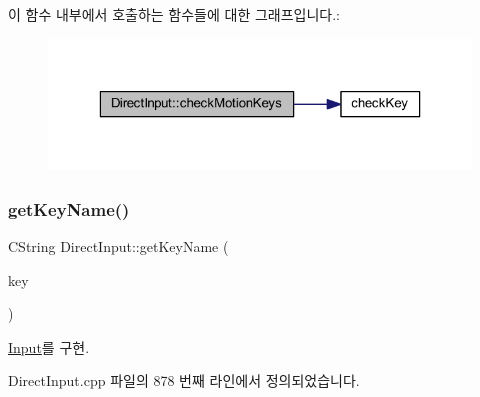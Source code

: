 이 함수 내부에서 호출하는 함수들에 대한 그래프입니다.\+:
\nopagebreak
\begin{figure}[H]
\begin{center}
\leavevmode
\includegraphics[width=323pt]{class_direct_input_a6e54dc09ff20e12dfe98a24607172c34_cgraph}
\end{center}
\end{figure}
\mbox{\label{class_direct_input_a8ea2797da0b1e806227628804591f63d}} 
\subsubsection{\texorpdfstring{get\+Key\+Name()}{getKeyName()}}
{\footnotesize\ttfamily C\+String Direct\+Input\+::get\+Key\+Name (\begin{DoxyParamCaption}\item[{L\+O\+N\+G\+\_\+\+P\+TR}]{key }\end{DoxyParamCaption})\hspace{0.3cm}{\ttfamily [virtual]}}



\mbox{\hyperlink{class_input_a2c4ec8a744b040657e220480987cd8bf}{Input}}를 구현.



Direct\+Input.\+cpp 파일의 878 번째 라인에서 정의되었습니다.


